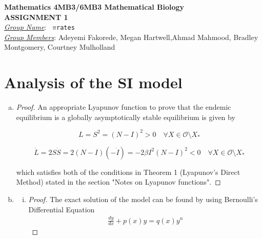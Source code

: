 \documentclass[12pt]{article}
\begin{document}
\begin{center}
{\bfseries Mathematics 4MB3/6MB3 Mathematical Biology\\
 ASSIGNMENT {\color{blue}1}}\\
\medskip
\underline{\emph{Group Name}}: \texttt{{\color{blue} $\pi$rates}}\\
\medskip
\underline{\emph{Group Members}}: {\color{blue}Adeyemi Fakorede, Megan Hartwell,Ahmad Mahmood, Bradley Montgomery, Courtney Mulholland}
\end{center}

\section{Analysis of the SI model}

\SIanalIntro
\begin{enumerate}[(a)]
\item \SIanalQa
  
  {\color{blue}
    \begin{proof}
	      An appropriate Lyapunov function to prove that the endemic equilibrium is a globally asymptotically stable equilibrium is given by 
	      
	      \begin{equation}
	      	L=S^2=(N-I)^2 > 0 \quad \forall X\in\mathcal{O}\setminus{X_*}
	      \end{equation}
	      
	       \begin{equation}
	      	\dot{L}=2S\dot{S}=2(N-I)(-\dot{I})=-2\beta I^2 (N-I)^2  < 0 \quad \forall X\in\mathcal{O}\setminus{X_*}
	      \end{equation}
	      
	      which satisfies both of the conditions in Theorem 1 (Lyapunov's Direct Method) stated in the section "Notes on Lyapunov functions".

    \end{proof}
  }
  
\item \SIanalQb
  \begin{enumerate}[(i)]
  \item \SIanalQbi
    
    {\color{blue}
      \begin{proof}
	       
	       The exact solution of the model can be found by using Bernoulli's Differential Equation
	       \begin{equation}
	       {\displaystyle {\begin{aligned}
	       \frac{dy}{dx}+p(x)y=q(x)y^n
	       \end{aligned}}}
	       \end{equation}
	       

\end{proof}}
\end{enumerate}
\end{enumerate}
\end{document}

